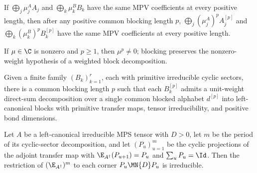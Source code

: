 \begin{lemma}%
    \label{thm:same_mpv2_pos_to_tensor_from_blocks_block_power}
    \leanok
    If $\bigoplus_j \mu^A_j A_j$ and $\bigoplus_k \mu^B_k B_k$ have the same MPV
    coefficients at every positive length, then after any positive common
    blocking length $p$, $\bigoplus_j (\mu^A_j)^p A_j^{[p]}$ and
    $\bigoplus_k (\mu^B_k)^p B_k^{[p]}$ have the same MPV coefficients at every
    positive length.
\end{lemma}

\begin{lemma}%
    \label{lem:block_weights_ne_zero}
    \leanok
    If $\mu \in \C$ is nonzero and $p \ge 1$, then $\mu^p \neq 0$; blocking
    preserves the nonzero-weight hypothesis of a weighted block decomposition.
\end{lemma}

\begin{lemma}%
    \label{thm:exists_common_blocked_cyclic_sector_family}
    \leanok
    Given a finite family $(B_k)_{k=1}^r$, each with primitive irreducible cyclic
    sectors, there is a common blocking length $p$ such that each $B_k^{[p]}$
    admits a unit-weight direct-sum decomposition over a single common blocked
    alphabet $d^{[p]}$ into left-canonical blocks with primitive transfer maps,
    tensor irreducibility, and positive bond dimensions.
\end{lemma}

\begin{lemma}%
    \label{thm:sector_irred_unconditional}
    \leanok
    Let $A$ be a left-canonical irreducible MPS tensor with $D>0$, let $m$ be the
    period of its cyclic-sector decomposition, and let $(P_u)_{u=1}^m$ be the
    cyclic projections of the adjoint transfer map with
    $\E_{A^\dagger}(P_{u+1}) = P_u$ and $\sum_u P_u = \Id$. Then the restriction
    of $(\E_{A^\dagger})^m$ to each corner $P_u \MN{D} P_u$ is irreducible.
\end{lemma}

